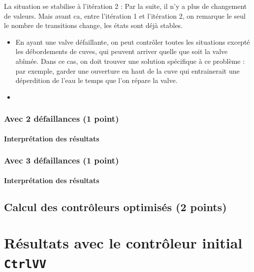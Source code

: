 \documentclass[a4paper]{book}
\begin{document}
La situation se stabilise à l'itération 2 : Par la suite, il n'y a plus de changement de valeurs. Mais avant ca, entre l'itération 1 et l'itération 2, on remarque le seul le nombre de transitions change, les états sont déjà stables.

\begin{itemize}
	\item En ayant une valve défaillante, on peut contrôler toutes les situations excepté les débordements de cuves, qui peuvent arriver quelle que soit la valve abîmée. Dans ce cas, on doit trouver une solution spécifique à ce problème : par exemple, garder une ouverture en haut de la cuve qui entrainerait une déperdition de l'eau le temps que l'on répare la valve.
	\item 

\end{itemize}
\subsubsection{Avec 2 défaillances (1 point)}





\paragraph{Interprétation des résultats}

\subsubsection{Avec 3 défaillances (1 point)}





\paragraph{Interprétation des résultats}

\subsection{Calcul des contrôleurs optimisés (2 points)}

\section{Résultats avec le contrôleur initial {\tt CtrlVV}}
\end{document}
